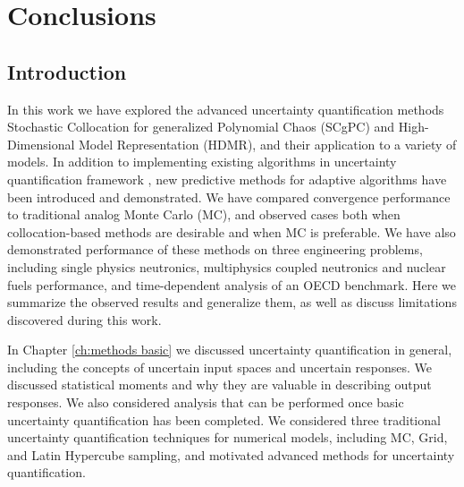 
\chapter{Conclusions} %

\label{ch:concl} %



\section{Introduction}
In this work we have explored the advanced uncertainty quantification methods Stochastic Collocation for
generalized Polynomial Chaos (SCgPC) and High-Dimensional Model Representation (HDMR), and their application 
to a variety of models.
In addition to implementing existing algorithms in uncertainty quantification framework \raven{},
new predictive methods for adaptive algorithms have been introduced
and demonstrated.  We have compared convergence performance to traditional analog Monte Carlo (MC), and observed cases both
when collocation-based methods are desirable and when MC is preferable.  We have also demonstrated performance
of these methods on three engineering problems, including single physics neutronics, multiphysics
coupled neutronics and nuclear fuels performance, and time-dependent analysis of an OECD benchmark.  Here we
summarize the observed results and generalize them, as well as discuss limitations discovered during this work.

In Chapter \ref{ch:methods basic} we discussed uncertainty quantification in general, including the concepts
of uncertain input spaces and uncertain responses.  We discussed statistical moments and why they are valuable
in describing output responses.  We also considered analysis that can be performed once basic uncertainty
quantification has been completed.  We considered three traditional uncertainty quantification techniques for numerical
models, including MC, Grid, and Latin Hypercube sampling, and motivated advanced methods for uncertainty
quantification.

